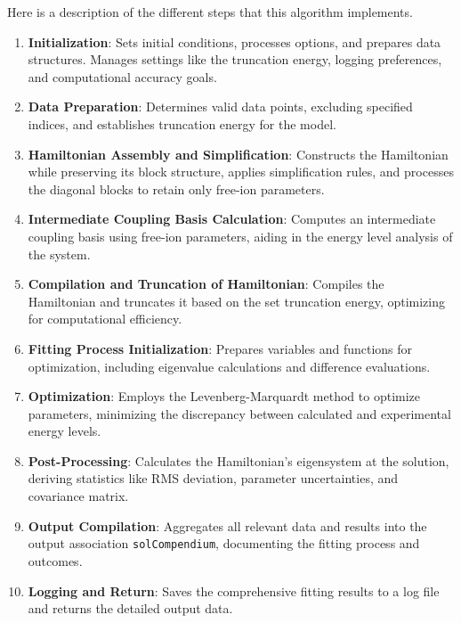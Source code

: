 \documentclass{article}
\newcommand{\codetext}[1]{{\color{BlueViolet} \texttt{#1}}}
\begin{document}
Here is a description of the different steps that this algorithm implements.
\begin{enumerate}
  \item \textbf{Initialization}: Sets initial conditions, processes options, and prepares data structures. Manages settings like the truncation energy, logging preferences, and computational accuracy goals.
  
  \item \textbf{Data Preparation}: Determines valid data points, excluding specified indices, and establishes truncation energy for the model.
  
  \item \textbf{Hamiltonian Assembly and Simplification}: Constructs the Hamiltonian while preserving its block structure, applies simplification rules, and processes the diagonal blocks to retain only free-ion parameters.
  
  \item \textbf{Intermediate Coupling Basis Calculation}: Computes an intermediate coupling basis using free-ion parameters, aiding in the energy level analysis of the system.
  
  \item \textbf{Compilation and Truncation of Hamiltonian}: Compiles the Hamiltonian and truncates it based on the set truncation energy, optimizing for computational efficiency.
  
  \item \textbf{Fitting Process Initialization}: Prepares variables and functions for optimization, including eigenvalue calculations and difference evaluations.
  
  \item \textbf{Optimization}: Employs the Levenberg-Marquardt method to optimize parameters, minimizing the discrepancy between calculated and experimental energy levels.
  
  \item \textbf{Post-Processing}: Calculates the Hamiltonian's eigensystem at the solution, deriving statistics like RMS deviation, parameter uncertainties, and covariance matrix.
  
  \item \textbf{Output Compilation}: Aggregates all relevant data and results into the output association \codetext{solCompendium}, documenting the fitting process and outcomes.
  
  \item \textbf{Logging and Return}: Saves the comprehensive fitting results to a log file and returns the detailed output data.
\end{enumerate}
\end{document}
